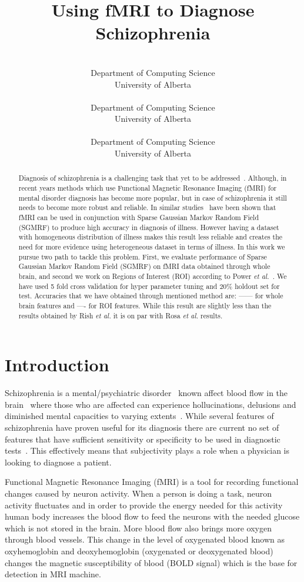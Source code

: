 \documentclass{article} %
\title{Using fMRI to Diagnose Schizophrenia}
\author{%
	\\
	Department of Computing Science\\
	University of Alberta\\
	\texttt{} 
\And 
 \\
Department of Computing Science\\
University of Alberta\\
\texttt{}
\And 
\\
Department of Computing Science\\
University of Alberta\\
\texttt{}  
}
\begin{document}
	\maketitle

\begin{abstract}
Diagnosis of schizophrenia is a challenging task that yet to be 
addressed~\cite{McGuire200891}. Although, in recent years methods which use 
Functional Magnetic Resonance Imaging (fMRI) for mental disorder diagnosis has 
become more popular, but in case of schizophrenia it still needs to become 
more robust and reliable. In similar studies~\cite{Rish_2013}\cite{Rosa_2013} 
have been shown that fMRI can be used in conjunction with Sparse Gaussian 
Markov Random Field (SGMRF) to produce high accuracy in diagnosis of illness. 
However having a dataset with homogeneous distribution of illness makes this 
result less reliable and creates the need for more evidence using 
heterogeneous dataset in terms of illness. In this work we pursue two path to 
tackle this problem. First, we evaluate performance of Sparse Gaussian Markov 
Random Field (SGMRF) on fMRI data obtained through whole brain, and second we 
work on Regions of Interest (ROI) according to Power \emph{et al.}~\cite{Power_2011}. 
We have used 5 fold cross validation for hyper parameter tuning and $20\%$ 
holdout set for test. Accuracies that we have obtained through mentioned 
method are: ------ for whole brain features and ---- for ROI features. While 
this result are slightly less than the results obtained by Rish \emph{et al.} 
it is on par with Rosa \emph{et al.} results.  
\end{abstract}


\section{Introduction}
Schizophrenia is a mental/psychiatric disorder~\cite{Rish_2013, Kenji_2010} 
known affect blood flow in the brain~\cite{Kenji_2010} where those who are 
affected can experience hollucinations, delusions and diminished mental 
capacities to varying extents~\cite{jablensky2010diagnostic}. While several
features of schizophrenia have proven useful for its diagnosis there are
current no set of features that have sufficient sensitivity or specificity
to be used in diagnostic tests~\cite{jablensky2010diagnostic}. This 
effectively means that subjectivity plays a role when a physician is
looking to diagnose a patient. 

Functional Magnetic Resonance Imaging (fMRI) is a tool for recording 
functional changes caused by neuron activity\cite{}. When a person is doing a task, 
neuron activity fluctuates and in order to provide the energy 
needed for this activity human body increases the blood flow to feed the neurons with 
the needed glucose which is not stored in the brain\cite{}. More blood flow also 
brings more oxygen through blood vessels. This change in the level of 
oxygenated blood known as oxyhemoglobin and deoxyhemoglobin (oxygenated or 
deoxygenated blood) changes the magnetic susceptibility of blood (BOLD signal) 
which is the base for detection in MRI machine\cite{}.
\end{document}
